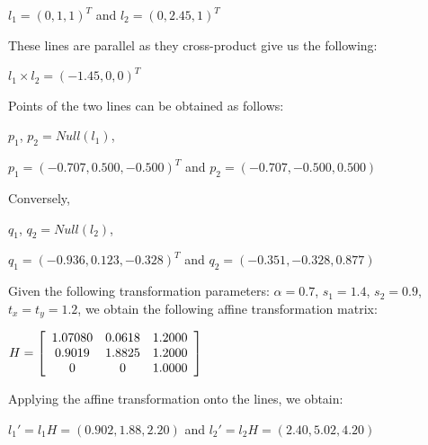 \documentclass[]{article}
\begin{document}
\vspace{0.5em}

\centerline {
	$l_1 = (0, 1, 1)^T$ and $l_2=(0,2.45,1)^T$
}

\vspace{0.5em}

These lines are parallel as they cross-product give us the following:

\vspace{0.5em}

\centerline {
	$l_1 \times l_2 = (-1.45, 0, 0)^T$
}

\vspace{0.5em}
Points of the two lines can be obtained as follows:

\vspace{0.5em}

\centerline {
	$p_1$, $p_2 = Null(l_1)$, 
}

\vspace{0.5em}

\centerline {
	$p_1=(-0.707, 0.500, -0.500)^T$ and $p_2=(-0.707, -0.500, 0.500)$ 
}

\vspace{0.5em}

Conversely, 


\centerline {
	$q_1$, $q_2 = Null(l_2)$, 
}

\vspace{0.5em}

\centerline {
	$q_1=(-0.936, 0.123, -0.328)^T$ and $q_2=(-0.351, -0.328, 0.877)$ 
}

Given the following transformation parameters: $\alpha = 0.7$, $s_1=1.4$, $s_2=0.9$, $t_x=t_y=1.2$, we obtain the following affine transformation matrix:

\vspace{0.5em}

\centerline {
	$H = \left[ {\begin{array}{*{20}c}
		1.07080 & 0.0618 & 1.2000 \\
		0.9019 & 1.8825 & 1.2000 \\
		0 & 0 & 1.0000
		\end{array} } \right] $
}

\vspace{0.5em}

Applying the affine transformation onto the lines, we obtain:

\vspace{0.5em}

\centerline {
	$l_1' = l_1H = (0.902, 1.88, 2.20)$ and $l_2' = l_2H = (2.40, 5.02, 4.20)$ 
}
\end{document}
